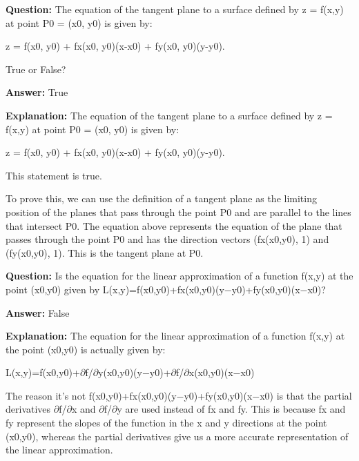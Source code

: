 \documentclass{article}
\begin{document}
                \vspace{0.5cm} 
        
            
                \textbf {Question:} The equation of the tangent plane to a surface defined by z = f(x,y) at point P0 = (x0, y0) is given by:

z = f(x0, y0) + fx(x0, y0)(x-x0) + fy(x0, y0)(y-y0).

True or False?
                
                \textbf{Answer:} True

                \textbf{Explanation:} The equation of the tangent plane to a surface defined by z = f(x,y) at point P0 = (x0, y0) is given by:

z = f(x0, y0) + fx(x0, y0)(x-x0) + fy(x0, y0)(y-y0).

This statement is true. 

To prove this, we can use the definition of a tangent plane as the limiting position of the planes that pass through the point P0 and are parallel to the lines that intersect P0. The equation above represents the equation of the plane that passes through the point P0 and has the direction vectors (fx(x0,y0), 1) and (fy(x0,y0), 1). This is the tangent plane at P0.
                
                \vspace{0.5cm} 
        
            
                \textbf {Question:} Is the equation for the linear approximation of a function f(x,y) at the point (x0,y0) given by L(x,y)=f(x0,y0)+fx(x0,y0)(y\ensuremath{-}y0)+fy(x0,y0)(x\ensuremath{-}x0)?
                
                \textbf{Answer:} False

                \textbf{Explanation:} The equation for the linear approximation of a function f(x,y) at the point (x0,y0) is actually given by:

L(x,y)=f(x0,y0)+\ensuremath{\partial}f/\ensuremath{\partial}y(x0,y0)(y\ensuremath{-}y0)+\ensuremath{\partial}f/\ensuremath{\partial}x(x0,y0)(x\ensuremath{-}x0)

The reason it's not f(x0,y0)+fx(x0,y0)(y\ensuremath{-}y0)+fy(x0,y0)(x\ensuremath{-}x0) is that the partial derivatives \ensuremath{\partial}f/\ensuremath{\partial}x and \ensuremath{\partial}f/\ensuremath{\partial}y are used instead of fx and fy. This is because fx and fy represent the slopes of the function in the x and y directions at the point (x0,y0), whereas the partial derivatives give us a more accurate representation of the linear approximation.
                
\end{document}

